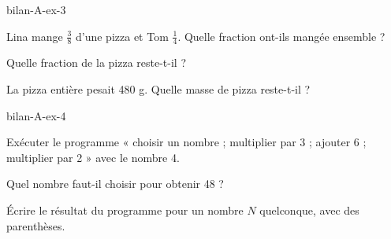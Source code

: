 \begin{blocEdition}{bilan-A-ex-3}
\begin{questions}
\item Lina mange $\frac38$ d’une pizza et Tom $\frac14$. Quelle fraction ont-ils mangée ensemble ?
\item Quelle fraction de la pizza reste-t-il ?
\item La pizza entière pesait 480 g. Quelle masse de pizza reste-t-il ?
\end{questions}\par{}\par\par{}\par{}\par{}\par{}\par{}\par{}
\end{blocEdition}
\begin{blocEdition}{bilan-A-ex-4}
\begin{questions}
\item Exécuter le programme « choisir un nombre ; multiplier par 3 ; ajouter 6 ; multiplier par 2 » avec le nombre 4.
\item Quel nombre faut-il choisir pour obtenir 48 ?
\item Écrire le résultat du programme pour un nombre $N$ quelconque, avec des parenthèses.
\end{questions}\par{}\par\par{}\par{}\par{}\par{}\par{}\par{}
\end{blocEdition}

